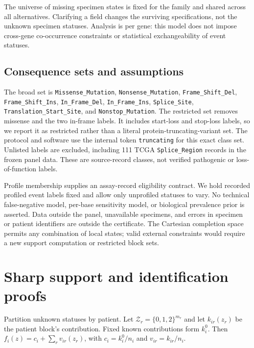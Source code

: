 \documentclass[10pt,letterpaper]{article}
\begin{document}
The universe of missing specimen states is fixed for the family and shared across all alternatives. Clarifying a field changes the surviving specifications, not the unknown specimen statuses. Analysis is per gene: this model does not impose cross-gene co-occurrence constraints or statistical exchangeability of event statuses.

\subsection{Consequence sets and assumptions}
{\raggedright The broad set is \texttt{Missense\_Mutation}, \texttt{Nonsense\_Mutation}, \texttt{Frame\_Shift\_Del}, \texttt{Frame\_Shift\_Ins}, \texttt{In\_Frame\_Del}, \texttt{In\_Frame\_Ins}, \texttt{Splice\_Site}, \texttt{Translation\_Start\_Site}, and \texttt{Nonstop\_Mutation}. The restricted set removes missense and the two in-frame labels. It includes start-loss and stop-loss labels, so we report it as restricted rather than a literal protein-truncating-variant set. The protocol and software use the internal token \texttt{truncating} for this exact class set. Unlisted labels are excluded, including 111 TCGA \texttt{Splice\_Region} records in the frozen panel data. These are source-record classes, not verified pathogenic or loss-of-function labels.\par}

Profile membership supplies an assay-record eligibility contract. We hold recorded profiled event labels fixed and allow only unprofiled statuses to vary. No technical false-negative model, per-base sensitivity model, or biological prevalence prior is asserted. Data outside the panel, unavailable specimens, and errors in specimen or patient identifiers are outside the certificate. The Cartesian completion space permits any combination of local states; valid external constraints would require a new support computation or restricted block sets.

\section{Sharp support and identification proofs}
Partition unknown statuses by patient. Let $\mathcal Z_r=\{0,1,2\}^{m_r}$ and let $k_{ir}(z_r)$ be the patient block's contribution. Fixed known contributions form $k_i^0$. Then $f_i(z)=c_i+\sum_r v_{ir}(z_r)$, with $c_i=k_i^0/n_i$ and $v_{ir}=k_{ir}/n_i$.
\end{document}
